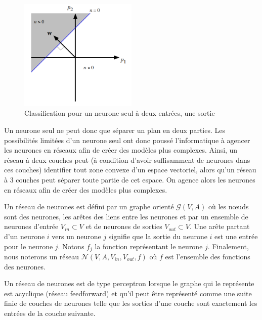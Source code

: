 \begin{figure}[h]
\begin{center}
\includegraphics[width=0.5\textwidth]{images/decisionNeuroneSeul.png}\caption{Classification pour un neurone seul à deux entrées, une sortie}
\end{center}
\end{figure} 

Un neurone seul ne peut donc que séparer un plan en deux parties. Les possibilités limitées d'un neurone seul ont donc poussé l'informatique à agencer les neurones en réseaux afin de créer des modèles plus complexes. Ainsi, un réseau à deux couches peut (à condition d'avoir suffisamment de neurones dans ces couches) identifier tout zone convexe d'un espace vectoriel, alors qu'un réseau à 3 couches peut séparer toute partie de cet espace. On agence alors les neurones en réseaux afin de créer des modèles plus complexes. \\

\begin{definition} 
Un réseau de neurones est défini par un graphe orienté $\mathcal{G}(V, A)$ où les n\oe{}uds sont des neurones, les arêtes des liens entre les neurones et par un ensemble de neurones d'entrée $V_{in} \subset V$ et de neurones de sorties $V_{out} \subset V$. Une arête partant d'un neurone $i$ vers un neurone $j$ signifie que la sortie du neurone $i$ est une entrée pour le neurone $j$. Notons $f_{j}$ la fonction représentant le neurone $j$. Finalement, nous noterons un réseau $\mathcal{N}(V, A, V_{in}, V_{out}, f)$ où $f$ est l'ensemble des fonctions des neurones.\\
\end{definition}

\begin{definition}[Perceptron]
Un réseau de neurones est de type perceptron lorsque le graphe qui le représente est acyclique (réseau feedforward) et qu'il peut être représenté comme une suite finie de couches de neurones telle que les sorties d'une couche sont exactement les entrées de la couche suivante.
\end{definition} 

